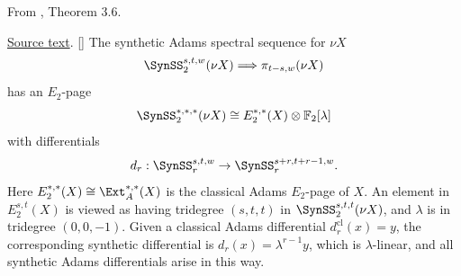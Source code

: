 \begin{theorem}
\label{paper:3.6}
From \cite{LWX126}, Theorem 3.6.\par

\href{paper/main.tex.html#L799}{Source text}.
[{\cite[Theorem A.8]{BHS}}] \label{thm:rigid}
    The synthetic Adams spectral sequence for $\nu X$
     $$\SynSS_2^{s,t,w}(\nu X)\Longrightarrow \pi_{t-s,w}(\nu X)$$
     has an $E_2$-page
    $$\SynSS_2^{*,*,*}(\nu X) \cong E_2^{*,*}(X)\otimes \mathbb{F}_2[\lambda]$$
    with differentials
    $$d_r: \SynSS_r^{s,t,w}\to \SynSS_r^{s+r,t+r-1,w}.$$
    Here $E_2^{*,*}(X) \cong \Ext_A^{*,*}(X)$ is the classical Adams $E_2$-page of $X$. An element in $E_2^{s,t}(X)$ is viewed as having tridegree $(s, t, t)$ in $\SynSS_2^{s,t,t}(\nu X)$, and $\lambda$ is in tridegree $(0, 0, -1)$. Given a classical Adams differential $d_r^{\mathrm{cl}}(x)=y$, the corresponding synthetic differential is $d_r(x)=\lambda^{r-1}y$, which is $\lambda$-linear, and all synthetic Adams differentials arise in this way.




\end{theorem}

